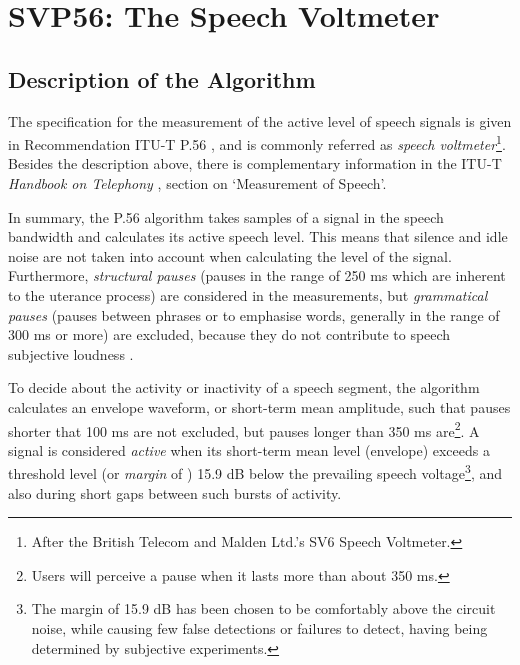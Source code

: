 \chapter{SVP56: The Speech Voltmeter}

\section{Description of the Algorithm}

The specification for the measurement of the active level of speech signals is given in Recommendation ITU-T P.56 \cite{P.56}\cite{P.56-rev}, and is commonly referred as {\em speech voltmeter}\footnote{\SF After the British Telecom and Malden Ltd.'s SV6 Speech Voltmeter.}.
Besides the description above, there is complementary information in the ITU-T {\em Handbook on Telephony} \cite{Hndbk-tel}, section on `Measurement of Speech'.

In summary, the P.56 algorithm takes samples of a signal in the speech
bandwidth and calculates its active speech level. This means that
silence and idle noise are not taken into account when calculating the
level of the signal. Furthermore, {\it structural pauses} (pauses in
the range of 250 ms which are inherent to the uterance process) are
considered in the measurements, but {\em grammatical pauses} (pauses between
phrases or to emphasise words, generally in the range of 300 ms or
more) are excluded, because they do not contribute to speech
subjective loudness \cite{Hndbk-tel}.

To decide about the activity or inactivity of a speech segment, the
algorithm calculates an envelope waveform, or short-term mean
amplitude, such that pauses shorter that 100 ms are not excluded, but
pauses longer than 350 ms are\footnote{\SF Users will perceive a pause when it
lasts more than about 350 ms.}. A signal is considered {\em active}
when its short-term mean level (envelope) exceeds a threshold level
(or {\em margin} of ) 15.9 dB below the prevailing speech
voltage\footnote{\SF The margin of 15.9 dB has been chosen to be
comfortably above the circuit noise, while causing few false detections
or failures to detect, having being determined by subjective
experiments.}, and also during short gaps between such bursts of
activity.

